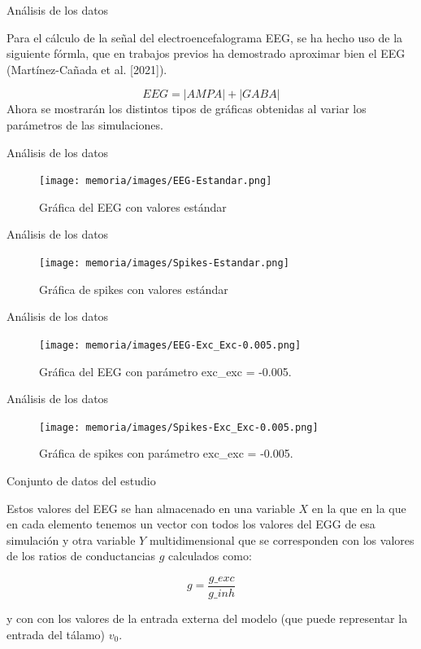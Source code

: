 \documentclass{beamer}
\begin{document}
\begin{frame}{Análisis de los datos}

Para el cálculo de la señal del electroencefalograma EEG, se ha hecho uso de la siguiente fórmla, que en trabajos previos ha demostrado aproximar bien el EEG (Martínez-Cañada et al. [2021]).

   $$ EEG = |AMPA| + |GABA| $$
\pause
Ahora se mostrarán los distintos tipos de gráficas obtenidas al variar los parámetros de las simulaciones.

\end{frame}


\begin{frame}{Análisis de los datos}
\begin{figure}
\centering
\texttt{[image: memoria/images/EEG-Estandar.png]}
\caption{Gráfica del EEG con valores estándar}
\end{figure}


\end{frame}

\begin{frame}{Análisis de los datos}

\begin{figure}
    \centering
    \texttt{[image: memoria/images/Spikes-Estandar.png]}
    \caption{Gráfica de spikes con valores estándar}
\end{figure}


\end{frame}

\begin{frame}{Análisis de los datos}
\begin{figure}
\centering
\texttt{[image: memoria/images/EEG-Exc\_Exc-0.005.png]}
\caption{Gráfica del EEG con parámetro exc\_exc = -0.005.}
\end{figure}


\end{frame}

\begin{frame}{Análisis de los datos}

\begin{figure}
    \centering
    \texttt{[image: memoria/images/Spikes-Exc\_Exc-0.005.png]}
    \caption{Gráfica de spikes con parámetro exc\_exc = -0.005.}
\end{figure}


\end{frame}

\begin{frame}{Conjunto de datos del estudio}

Estos valores del EEG se han almacenado en una variable $X$ en la que en la que en cada elemento tenemos un vector con todos los valores del EGG de esa simulación y otra variable $Y$ multidimensional que se corresponden con los valores de los ratios de conductancias $g$ calculados como:


 $$   g = \frac{g\_exc}{g\_inh} $$


y con con los valores de la entrada externa del modelo (que puede representar la entrada del tálamo) $v_0$.


\end{frame}
\end{document}
